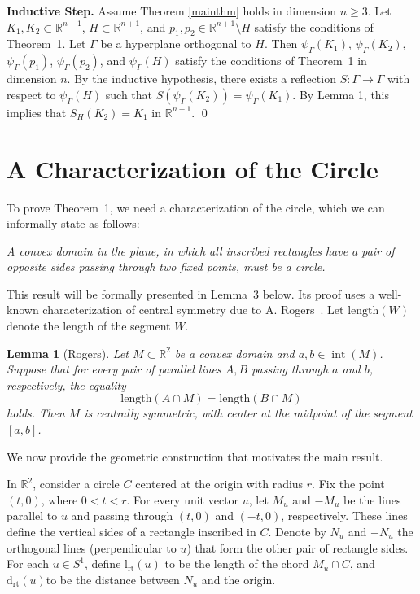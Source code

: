 \documentclass[12pt]{article}
\newtheorem{lemma}{Lemma}
\begin{document}
	\textbf{Inductive Step.} Assume Theorem \ref{mainthm} holds in dimension $n \geq 3$. Let $K_1, K_2 \subset \mathbb{R}^{n+1}$, $H \subset \mathbb{R}^{n+1}$, and $p_1, p_2 \in \mathbb{R}^{n+1} \setminus H$ satisfy the conditions of Theorem~1. Let $\Gamma$ be a hyperplane orthogonal to $H$. Then $\psi_\Gamma(K_1)$, $\psi_\Gamma(K_2)$, $\psi_\Gamma(p_1)$, $\psi_\Gamma(p_2)$, and $\psi_\Gamma(H)$ satisfy the conditions of Theorem~1 in dimension $n$. By the inductive hypothesis, there exists a reflection $S : \Gamma \to \Gamma$ with respect to $\psi_\Gamma(H)$ such that $S(\psi_\Gamma(K_2)) = \psi_\Gamma(K_1)$. By Lemma 1, this implies that $S_H(K_2) = K_1$ in $\mathbb{R}^{n+1}$.
	\qed
	
	
	\section{A Characterization of the Circle}
	
	To prove Theorem~1, we need a characterization of the circle, which we can informally state as follows:
	
	\textit{A convex domain in the plane, in which all inscribed rectangles have a pair of opposite sides passing through two fixed points, must be a circle.}
	
	This result will be formally presented in Lemma~3 below. Its proof uses a well-known characterization of central symmetry due to A. Rogers~\cite{Rogers1981}. Let $\text{length}(W)$ denote the length of the segment $W$.
	
	\begin{lemma}[Rogers]
		Let $M \subset \mathbb{R}^2$ be a convex domain and $a, b \in \operatorname{int}(M)$. Suppose that for every pair of parallel lines $A, B$ passing through $a$ and $b$, respectively, the equality
		\[
		\text{length}(A \cap M) = \text{length}(B \cap M)
		\]
		holds. Then $M$ is centrally symmetric, with center at the midpoint of the segment $[a, b]$.
	\end{lemma}
	
	We now provide the geometric construction that motivates the main result.
	
	In $\mathbb{R}^2$, consider a circle $C$ centered at the origin with radius $r$. Fix the point $(t, 0)$, where $0 < t < r$. For every unit vector $u$, let $M_u$ and $-M_u$ be the lines parallel to $u$ and passing through $(t, 0)$ and $(-t, 0)$, respectively. These lines define the vertical sides of a rectangle inscribed in $C$. Denote by $N_u$ and $-N_u$ the orthogonal lines (perpendicular to $u$) that form the other pair of rectangle sides. For each $u \in S^1$, define $\operatorname{l_{rt}}(u)$ to be the length of the chord $M_u \cap C$, and $\operatorname{d_{rt}}(u)$to be the distance between $N_u$ and the origin.
	
\end{document}
